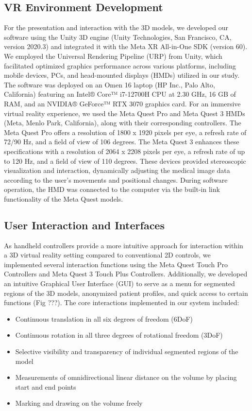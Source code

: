 \documentclass{bmcart}
\begin{document}
\subsection{VR Environment Development}
For the presentation and interaction with the 3D models, we developed our software using the Unity 3D engine (Unity Technologies, San Francisco, CA, version 2020.3) and integrated it with the Meta XR All-in-One SDK (version 60). We employed the Universal Rendering Pipeline (URP) from Unity, which facilitated optimized graphics performance across various platforms, including mobile devices, PCs, and head-mounted displays (HMDs) utilized in our study.
The software was deployed on an Omen 16 laptop (HP Inc., Palo Alto, California) featuring an Intel® Core™ i7-12700H CPU at 2.30 GHz, 16 GB of RAM, and an NVIDIA® GeForce™ RTX 3070 graphics card. For an immersive virtual reality experience, we used the Meta Quest Pro and Meta Quest 3 HMDs (Meta, Menlo Park, California), along with their corresponding controllers. The Meta Quest Pro offers a resolution of 1800 x 1920 pixels per eye, a refresh rate of 72/90 Hz, and a field of view of 106 degrees. The Meta Quest 3 enhances these specifications with a resolution of 2064 x 2208 pixels per eye, a refresh rate of up to 120 Hz, and a field of view of 110 degrees. These devices provided stereoscopic visualization and interaction, dynamically adjusting the medical image data according to the user's movements and positional changes. During software operation, the HMD was connected to the computer via the built-in link functionality of the Meta Quest models.
\subsection{User Interaction and Interfaces}
As handheld controllers provide a more intuitive approach for interaction within a 3D virtual reality setting compared to conventional 2D controls, we implemented several interaction functions using the Meta Quest Touch Pro Controllers and Meta Quest 3 Touch Plus Controllers. Additionally, we developed an intuitive Graphical User Interface (GUI) to serve as a menu for segmented regions of the 3D models, anonymized patient profiles, and quick access to certain functions (Fig ???). The core interactions implemented in our system included:
\begin{itemize}
  \item Continuous translation in all six degrees of freedom (6DoF)
  \item Continuous rotation in all three degrees of rotational freedom (3DoF)
  \item Selective visibility and transparency of individual segmented regions of the model
  \item Measurements of omnidirectional linear distance on the volume by placing start and end points
  \item Marking and drawing on the volume freely
\end{itemize}
\end{document}
